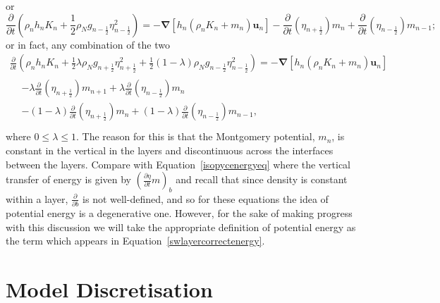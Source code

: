 \documentclass[10pt,a4paper]{report}
\newcommand*\equref[1]{Equation~\eqref{#1}}
\newcommand*{\half}{\frac{1}{2}}
\begin{document}
    or
    \begin{equation}
    \frac{\partial}{\partial t}\left(\rho_{n}h_{n} K_{n}+ 
    \half \rho_{N} g_{n-\half }\eta_{n-\half }^{2} \right) 
    = -\boldsymbol{\nabla} \left[h_{n} \left(\rho_{n}K_{n}+m_{n}\right) \boldsymbol{u}_{n}\right] 
    - \frac{\partial}{\partial t}\left(\eta_{n+\half }\right)   m_{n}
    + \frac{\partial}{\partial t}\left(\eta_{n-\half }\right) m_{n-1};
    \end{equation}
    or in fact, any combination of the two
    \begin{equation}
    \begin{split}
    \frac{\partial}{\partial t}\left(\rho_{n}h_{n} K_{n}+ 
    \half \lambda\rho_{N} g_{n+\half }\eta_{n+\half }^{2}  +
    \half \left(1-\lambda\right)\rho_{N} g_{n-\half }\eta_{n-\half }^{2} \right) 
    = -\boldsymbol{\nabla} \left[h_{n} \left(\rho_{n}K_{n}+m_{n}\right) \boldsymbol{u}_{n}\right] \\
    \begin{split}
    &- \lambda\frac{\partial}{\partial t}\left(\eta_{n+\half }\right)   m_{n+1}
    + \lambda\frac{\partial}{\partial t}\left(\eta_{n-\half }\right) m_{n} \\
    &- \left(1-\lambda\right)\frac{\partial}{\partial t}\left(\eta_{n+\half }\right)   m_{n}
    + \left(1-\lambda\right)\frac{\partial}{\partial t}\left(\eta_{n-\half }\right) m_{n-1}, \\
    \end{split}
    \end{split}
    \end{equation}
    where $0 \leq \lambda \leq 1$. The reason for this is that the Montgomery potential,
    $m_{n}$, is constant in the vertical in the layers and discontinuous across the interfaces between the layers. Compare with \equref{isopycenergyeq} where the 
    vertical transfer of energy is given by 
    $\left(\frac{\partial \eta}{\partial t} m \right)_{b}$ and recall that since density is
     constant within a layer, $\frac{\partial }{\partial b}$ is not well-defined, and so for
      these equations the idea of potential energy is a degenerative one. However,
      for the sake of making progress with this discussion we will take the
      appropriate definition of potential energy as the term which appears in \equref{swlayercorrectenergy}.
    
    

\section{Model Discretisation}
\end{document}
